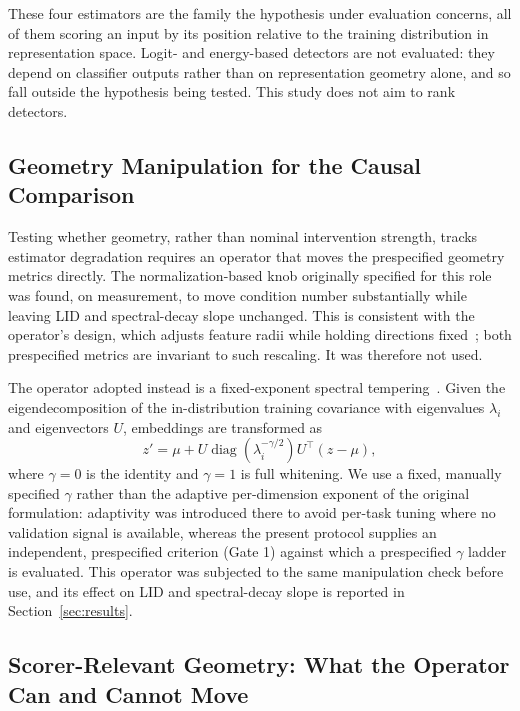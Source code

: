 These four estimators are the family the hypothesis under evaluation concerns,
all of them scoring an input by its position relative to the training
distribution in representation space. Logit- and energy-based detectors are
not evaluated: they depend on classifier outputs rather than on representation
geometry alone, and so fall outside the hypothesis being tested. This study
does not aim to rank detectors.

\subsection{Geometry Manipulation for the Causal Comparison}

Testing whether geometry, rather than nominal intervention strength, tracks
estimator degradation requires an operator that moves the prespecified
geometry metrics directly. The normalization-based knob originally specified
for this role was found, on measurement, to move condition number
substantially while leaving LID and spectral-decay slope unchanged. This is
consistent with the operator's design, which adjusts feature radii while
holding directions fixed~\cite{yu2510dissecting}; both prespecified metrics
are invariant to such rescaling. It was therefore not used.

The operator adopted instead is a fixed-exponent spectral
tempering~\cite{li2603spectral}. Given the eigendecomposition of the
in-distribution training covariance with eigenvalues $\lambda_i$ and
eigenvectors $U$, embeddings are transformed as
\begin{equation}
  z' = \mu + U \operatorname{diag}\!\left(\lambda_i^{-\gamma/2}\right)
       U^{\top} (z - \mu),
\label{eq:tempering}
  \end{equation}
where $\gamma = 0$ is the identity and $\gamma = 1$ is full whitening. We use
a fixed, manually specified $\gamma$ rather than the adaptive per-dimension
exponent of the original formulation: adaptivity was introduced there to
avoid per-task tuning where no validation signal is available, whereas the
present protocol supplies an independent, prespecified criterion (Gate 1)
against which a prespecified $\gamma$ ladder is evaluated. This operator was
subjected to the same manipulation check before use, and its effect on LID
and spectral-decay slope is reported in Section~\ref{sec:results}.

\subsection{Scorer-Relevant Geometry: What the Operator Can and Cannot Move}
\label{sec:invariance}


